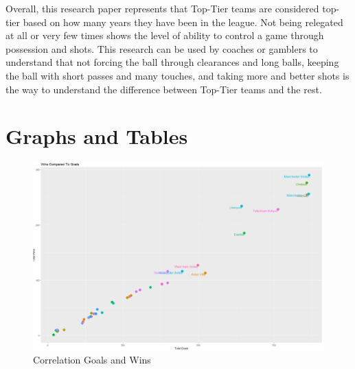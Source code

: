 \documentclass[12pt,english]{article}
\begin{document}
\indent Overall, this research paper represents that Top-Tier teams are considered top-tier based on how many years they have been in the league. Not being relegated at all or very few times shows the level of ability to control a game through possession and shots. This research can be used by coaches or gamblers to understand that not forcing the ball through clearances and long balls, keeping the ball with short passes and many touches, and taking more and better shots is the way to understand the difference between Top-Tier teams and the rest. 



\vfill
\pagebreak{}
\begin{spacing}{1.0}


\end{spacing}

\vfill
\pagebreak{}
\clearpage

\section*{Graphs and Tables}\label{sec:figTables}
\begin{figure}[ht]
\centering
\bigskip{}
\includegraphics[width=1.2\linewidth]{Correlation.PNG}
\caption{Correlation Goals and Wins}
\label{fig:fig1}
\end{figure}
\end{document}
